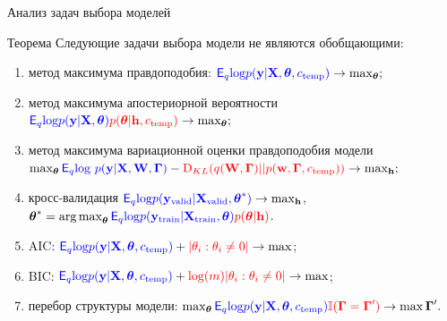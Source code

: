\documentclass[usenames,dvipsnames,11pt,pdf,utf8,russian,aspectratio=43]{beamer}
\DeclareMathOperator*{\argmax}{arg\,max}
\begin{document}
\begin{frame}{Анализ задач выбора моделей}
\begin{block}{Теорема}
Следующие задачи выбора модели не являются обобщающими:
\begin{enumerate}
\item метод максимума правдоподобия: $\textcolor{blue}{\mathsf{E}_q \text{log} p(\mathbf{y}|\mathbf{X}, \boldsymbol{\theta}, c_\text{temp})} \to \max_{\boldsymbol{\theta}};$
\item метод максимума апостериорной вероятности $\textcolor{blue}{\mathsf{E}_q \text{log} p(\mathbf{y}|\mathbf{X},  \boldsymbol{\theta})}\textcolor{red}{p( \boldsymbol{\theta}| \mathbf{h}, c_\text{temp})} \to \max_{\boldsymbol{\theta}};$
\item метод максимума вариационной оценки правдоподобия модели $\max_{\boldsymbol{\theta}} \textcolor{blue}{\mathsf{E}_q \text{log}~{p(\mathbf{y} | \mathbf{X}, \mathbf{W}, \boldsymbol{\Gamma})}} - \textcolor{red}{\text{D}_{KL}(q(\mathbf{W}, \boldsymbol{\Gamma})||p(\mathbf{w}, \boldsymbol{\Gamma}, c_\text{temp}))} \to \max_{\mathbf{h}};$
\item кросс-валидация $\textcolor{blue}{\mathsf{E}_q \text{log}p(\mathbf{y}_\text{valid}|\mathbf{X}_\text{valid}, \boldsymbol{\theta}^{*})} \to \max_{\mathbf{h}}$, $\boldsymbol{\theta}^{*} = \argmax_{\boldsymbol{\theta}} \textcolor{blue}{\mathsf{E}_q \text{log}p(\mathbf{y}_\text{train}|\mathbf{X}_\text{train}, \boldsymbol{\theta})}\textcolor{red}{p(\boldsymbol{\theta}| \mathbf{h})}$.
\item AIC: $\textcolor{blue}{\mathsf{E}_q \text{log} p(\mathbf{y}|\mathbf{X}, \boldsymbol{\theta}, c_\text{temp})} + \textcolor{red}{|\theta_i: \theta_i \neq 0|} \to \max$;
\item BIC: $\textcolor{blue}{\mathsf{E}_q \text{log} p(\mathbf{y}|\mathbf{X}, \boldsymbol{\theta}, c_\text{temp})} + \textcolor{red}{\text{log}(m)|\theta_i: \theta_i \neq 0|} \to \max$;
\item перебор структуры модели:  $\max_{\boldsymbol{\theta}} \textcolor{blue}{\mathsf{E}_q \text{log} p(\mathbf{y}|\mathbf{X}, \boldsymbol{\theta}, c_\text{temp})}\textcolor{red}{\mathbb{I}(\boldsymbol{\Gamma} = \boldsymbol{\Gamma}') }\to \max{\boldsymbol{\Gamma}'}.$
\end{enumerate}
\end{block}
\end{frame}
\end{document}
